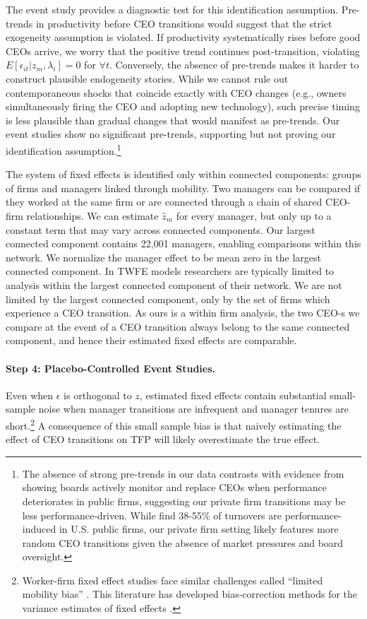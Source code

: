 \documentclass[11pt,a4paper]{article}
\begin{document}
The event study provides a diagnostic test for this identification assumption. Pre-trends in productivity before CEO transitions would suggest that the strict exogeneity assumption is violated. If productivity systematically rises before good CEOs arrive, we worry that the positive trend continues post-transition, violating $E[\epsilon_{it}|z_m, \lambda_i] = 0$ for $\forall t$. Conversely, the absence of pre-trends makes it harder to construct plausible endogeneity stories. While we cannot rule out contemporaneous shocks that coincide exactly with CEO changes (e.g., owners simultaneously firing the CEO and adopting new technology), such precise timing is less plausible than gradual changes that would manifest as pre-trends. Our event studies show no significant pre-trends, supporting but not proving our identification assumption.\footnote{The absence of strong pre-trends in our data contrasts with evidence from \citet{cornelli2013monitoring} showing boards actively monitor and replace CEOs when performance deteriorates in public firms, suggesting our private firm transitions may be less performance-driven. While \citet{jenter2021performance} find 38-55\% of turnovers are performance-induced in U.S. public firms, our private firm setting likely features more random CEO transitions given the absence of market pressures and board oversight.}

The system of fixed effects is identified only within connected components: groups of firms and managers linked through mobility. Two managers can be compared if they worked at the same firm or are connected through a chain of shared CEO-firm relationships. We can estimate $\hat z_m$ for every manager, but only up to a constant term that may vary across connected components. Our largest connected component contains 22,001 managers, enabling comparisons within this network. We normalize the manager effect to be mean zero in the largest connected component.
In TWFE models researchers are typically limited to analysis within the largest connected component of their network. We are not limited by the largest connected component, only by the set of firms which experience a CEO transition. 
As ours is a within firm analysis, the two CEO-s we compare at the event of a CEO transition always belong to the same connected component, and hence their estimated fixed effects are comparable.
\paragraph{Step 4: Placebo-Controlled Event Studies.} Even when $\epsilon$ is orthogonal to $z$, estimated fixed effects contain substantial small-sample noise when manager transitions are infrequent and manager tenures are short.\footnote{Worker-firm fixed effect studies face similar challenges called ``limited mobility bias'' \citep{andrews2008high}. This literature has developed bias-correction methods for the variance estimates of fixed effects \citep{Bonhomme2023-dx, gaure2014correlation}.} A consequence of this small sample bias is that naively estimating the effect of CEO transitions on TFP will likely overestimate the true effect.
\end{document}
